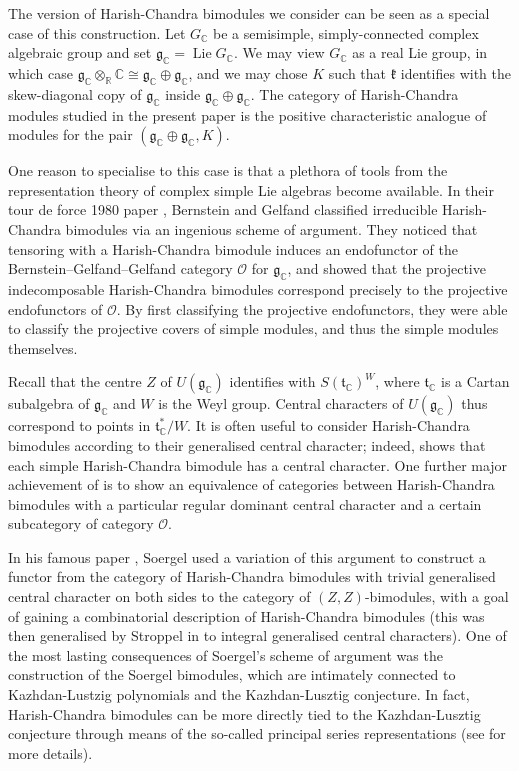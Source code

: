 \documentclass[twoside,12pt,reqno]{amsart}
\theoremstyle{remark}
\numberwithin{equation}{section}
\def\R{\mathbb{R}}
\def\Lie{\operatorname{Lie}}
\def\C{{\mathbb C}}
\def\g{{\mathfrak g}}
\def\t{\mathfrak t}
\def\kk{\mathfrak{k}}
\def\Oc{\mathcal{O}}
\begin{document}
The version of Harish-Chandra bimodules we consider can be seen as a special case of this construction. Let $G_\C$ be a semisimple, simply-connected complex algebraic group and set $\g_\C = \Lie G_\C$. We may view $G_\C$ as a real Lie group, in which case $\g_\C \otimes_\R \C \cong \g_\C \oplus \g_\C$, and we may chose $K$ such that $\kk$ identifies with the skew-diagonal copy of $\g_\C$ inside $\g_\C \oplus \g_\C$. The category of Harish-Chandra modules studied in the present paper is the positive characteristic analogue of modules for the pair $(\g_\C \oplus \g_\C, K)$.

One reason to specialise to this case is that a plethora of tools  from the representation theory of complex simple Lie algebras become available. In their tour de force 1980 paper \cite{BG}, Bernstein and Gelfand classified irreducible Harish-Chandra bimodules via an ingenious scheme of argument. They noticed that tensoring with a Harish-Chandra bimodule induces an endofunctor of the Bernstein--Gelfand--Gelfand category $\Oc$ for $\g_\C$, and showed that the projective indecomposable Harish-Chandra bimodules correspond precisely to the projective endofunctors of $\Oc$. By first classifying the projective endofunctors, they were able to classify the projective covers of simple modules, and thus the simple modules themselves.

Recall that the centre $Z$ of $U(\g_\C)$ identifies with $S(\t_\C)^W$, where $\t_\C$ is a Cartan subalgebra of $\g_\C$ and $W$ is the Weyl group. Central characters of $U(\g_\C)$ thus correspond to points in $\t_\C^*/W$. It is often useful to consider Harish-Chandra bimodules according to their generalised central character; indeed, \cite{BG} shows that each simple Harish-Chandra bimodule has a central character. One further major achievement of \cite{BG} is to show an equivalence of categories between Harish-Chandra bimodules with a particular regular dominant central character and a certain subcategory of category $\Oc$.

In his famous paper \cite{So}, Soergel used a variation of this argument to construct a functor from the category of Harish-Chandra bimodules with trivial generalised central character on both sides to the category of $(Z,Z)$-bimodules, with a goal of gaining a combinatorial description of Harish-Chandra bimodules (this was then generalised by Stroppel in \cite{Str} to integral generalised central characters). One of the most lasting consequences of Soergel's scheme of argument was the construction of the Soergel bimodules, which are intimately connected to Kazhdan-Lustzig polynomials and the Kazhdan-Lusztig conjecture. In fact, Harish-Chandra bimodules can be more directly tied to the Kazhdan-Lusztig conjecture through means of the so-called principal series representations (see \cite[Theorem 6.7]{BG} for more details).
\end{document}
